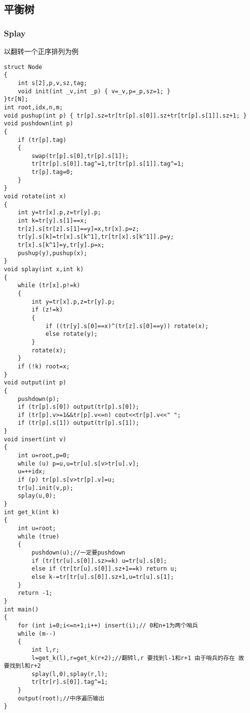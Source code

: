 \documentclass[a4paper]{ctexart}
\begin{document}
\subsection{平衡树}

\subsubsection{Splay}
以翻转一个正序排列为例
\begin{lstlisting}
struct Node
{
    int s[2],p,v,sz,tag;
    void init(int _v,int _p) { v=_v,p=_p,sz=1; }
}tr[N];
int root,idx,n,m;
void pushup(int p) { tr[p].sz=tr[tr[p].s[0]].sz+tr[tr[p].s[1]].sz+1; }
void pushdown(int p)
{
    if (tr[p].tag)
    {
        swap(tr[p].s[0],tr[p].s[1]);
        tr[tr[p].s[0]].tag^=1,tr[tr[p].s[1]].tag^=1;
        tr[p].tag=0;
    }
}
void rotate(int x)
{
    int y=tr[x].p,z=tr[y].p;
    int k=tr[y].s[1]==x;
    tr[z].s[tr[z].s[1]==y]=x,tr[x].p=z;
    tr[y].s[k]=tr[x].s[k^1],tr[tr[x].s[k^1]].p=y;
    tr[x].s[k^1]=y,tr[y].p=x;
    pushup(y),pushup(x);
}
void splay(int x,int k)
{
    while (tr[x].p!=k)
    {
        int y=tr[x].p,z=tr[y].p;
        if (z!=k)
        {
            if ((tr[y].s[0]==x)^(tr[z].s[0]==y)) rotate(x);
            else rotate(y);
        }
        rotate(x);
    }
    if (!k) root=x;
}
void output(int p)
{
    pushdown(p);
    if (tr[p].s[0]) output(tr[p].s[0]);
    if (tr[p].v>=1&&tr[p].v<=n) cout<<tr[p].v<<" ";
    if (tr[p].s[1]) output(tr[p].s[1]);
}
void insert(int v)
{
    int u=root,p=0;
    while (u) p=u,u=tr[u].s[v>tr[u].v];
    u=++idx;
    if (p) tr[p].s[v>tr[p].v]=u;
    tr[u].init(v,p);
    splay(u,0);
}
int get_k(int k)
{
    int u=root;
    while (true)
    {
        pushdown(u);//一定要pushdown
        if (tr[tr[u].s[0]].sz>=k) u=tr[u].s[0];
        else if (tr[tr[u].s[0]].sz+1==k) return u;
        else k-=tr[tr[u].s[0]].sz+1,u=tr[u].s[1];
    }
    return -1;
}
int main()
{
    for (int i=0;i<=n+1;i++) insert(i);// 0和n+1为两个哨兵
    while (m--)
    {
        int l,r;
        l=get_k(l),r=get_k(r+2);//翻转l,r 要找到l-1和r+1 由于哨兵的存在 故要找到l和r+2
        splay(l,0),splay(r,l);
        tr[tr[r].s[0]].tag^=1;
    }
    output(root);//中序遍历输出
}
\end{lstlisting}
\end{document}
